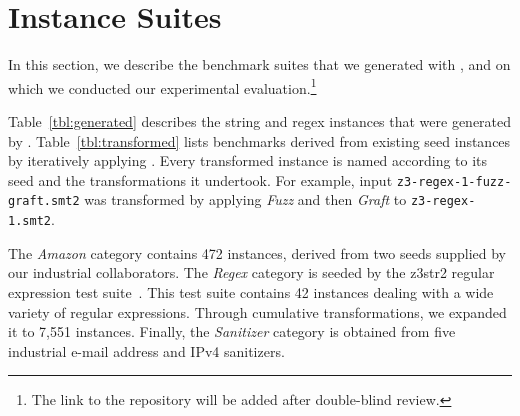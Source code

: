 \section{Instance Suites}
\label{sec:suites}

In this section, we describe the benchmark suites that we generated
with \fuzzer{}, and on which we conducted our experimental
evaluation.\footnote{The link to the repository will be added after
double-blind review.}

Table~\ref{tbl:generated} describes the string and regex instances that were
generated by \generator{}. Table~\ref{tbl:transformed} lists benchmarks
derived from existing seed instances by iteratively applying \transformer{}.
Every transformed instance is named according to its
seed and the transformations it undertook. For example, input
\texttt{z3-regex-1-fuzz-graft.smt2} was transformed by applying
\textit{Fuzz} and then \textit{Graft} to \texttt{z3-regex-1.smt2}.

The \textit{Amazon} category contains 472 instances, derived from two seeds
supplied by our industrial collaborators. The \textit{Regex} category is
seeded by the z3str2 regular expression test suite~\cite{z3str2-tests}. This
test suite contains 42 instances dealing with a wide variety of regular
expressions. Through cumulative transformations, we expanded it to 7,551
instances. Finally, the \textit{Sanitizer} category is obtained from
five industrial e-mail address and IPv4 sanitizers.


